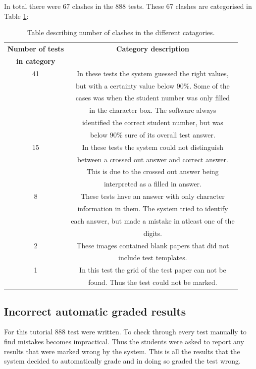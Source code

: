 In total there were 67 clashes in the 888 tests. These 67 clashes are categorised in Table  \ref{tbl:TutClash}:
\begin{table}
  \centering
\begin{tabular}{|c|c|}
\hline
\textbf{Number of tests} & \textbf{Category description}\\
\textbf{in category} &\\
\hline
41&In these tests the system guessed the right values,\\ 
&but with a certainty value below 90\%. Some of the\\
&cases was when the student number was only filled\\
&in the character box. The software always\\
&identified the correct student number, but was\\
&below 90\% sure of its overall test answer.\\
\hline
15&In these tests the system could not distinguish\\ 
&between a crossed out answer and correct answer.\\
&This is due to the crossed out answer being\\
&interpreted as a filled in answer.\\
\hline
8&These tests have an answer with only character\\ 
&information in them. The system tried to identify\\
&each answer, but made a mistake in atleast one of the\\
&digits.\\
\hline
2&These images contained blank papers that did not\\ 
&include test templates.\\
\hline
1&In this test the grid of the test paper can not be\\ 
&found. Thus the test could not be marked.\\
\hline
\end{tabular}
  \caption{Table describing number of clashes in the different catagories.} \label{tbl:TutClash}
\end{table}

\subsection{Incorrect automatic graded results}

For this tutorial 888 test were written. To check through every test manually to find mistakes becomes impractical. Thus the students were asked to report any results that were marked wrong by the system. This is all the results that the system decided to automatically grade and in doing so graded the test wrong.

